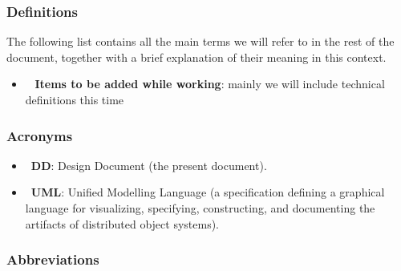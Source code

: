 \subsubsection{Definitions}

The following list contains all the main terms we will refer to in the rest of the document, together with a brief explanation of their meaning in this context.

\begin{itemize}
\item~ \textbf{Items to be added while working}: mainly we will include technical definitions this time
\end{itemize}

\subsubsection{Acronyms}

\begin{itemize}
\item~\textbf{DD}: Design Document (the present document).
\item~\textbf{UML}: Unified Modelling Language (a specification defining a graphical language for visualizing, specifying, constructing, and documenting the artifacts of distributed object systems).
\end{itemize}

\subsubsection{Abbreviations}

